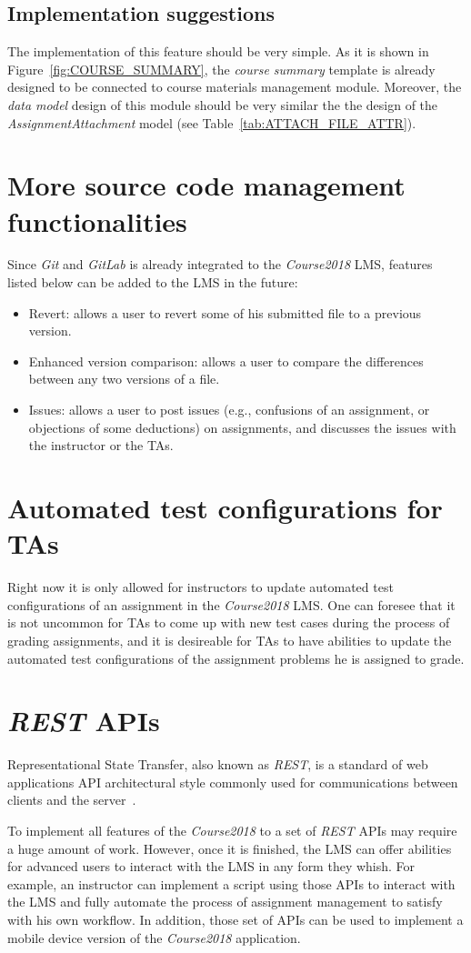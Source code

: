 \subsection{Implementation suggestions}
The implementation of this feature should be very simple.
As it is shown in
Figure~\ref{fig:COURSE_SUMMARY}, the \emph{course summary} template is already
designed to be connected to course materials management module.
Moreover, the \emph{data model} design of this module should
be very similar the the design of the \emph{AssignmentAttachment} model 
(see Table~\ref{tab:ATTACH_FILE_ATTR}).

\section{More source code management functionalities}
Since \emph{Git} and \emph{GitLab} is already integrated to the
\emph{Course2018} LMS, features listed below can be added to the LMS in the
future:
\begin{itemize}
    \item Revert: allows a user to revert some of his submitted file to a
        previous version.
    \item Enhanced version comparison: allows a user to compare the differences
        between any two versions of a file.
    \item Issues: allows a user to post issues (e.g., confusions of an
        assignment, or objections of some deductions) on assignments, and
        discusses the issues with the instructor or the TAs.
\end{itemize}

\section{Automated test configurations for TAs}
Right now it is only allowed for instructors to update automated test
configurations of an assignment in the \emph{Course2018} LMS.
One can foresee that it is not uncommon for TAs to come up with new test
cases during the process of grading assignments, and it is desireable for TAs
to have abilities to update the automated test configurations of the assignment
problems he is assigned to grade.

\section{\emph{REST} APIs}
Representational State Transfer, also known as \emph{REST}, is a standard of
web applications API architectural style commonly used for communications
between clients and the server~\citep[Chapter 5]{REST}.

To implement all features of the \emph{Course2018} to a set of \emph{REST} APIs
may require a huge amount of work. However, once it is finished, the LMS can
offer abilities for advanced users to interact with the LMS in any form they
whish. For example, an instructor can implement a script using those APIs to
interact with the LMS and fully automate the process of assignment management
to satisfy with his own workflow. In addition, those set of APIs can be used
to implement a mobile device version of the \emph{Course2018} application.